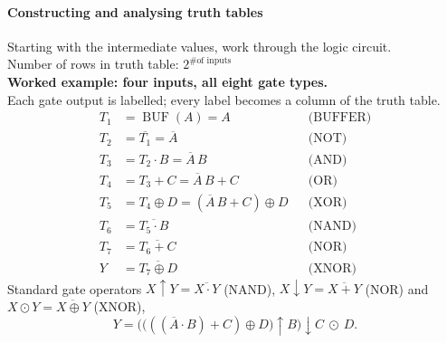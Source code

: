 \paragraph{Constructing and analysing truth tables}
Starting with the intermediate values, work through the logic circuit. \\
Number of rows in truth table: $2^\text{\# of inputs}$\\
\textbf{Worked example: four inputs, all eight gate types.}\\
Each gate output is labelled; every label becomes a column of the truth table.
\[
\begin{aligned}
T_1 &= \operatorname{BUF}(A) = A &&\text{(BUFFER)}\\
T_2 &= \overline{T_1} = \overline{A} &&\text{(NOT)}\\
T_3 &= T_2 \cdot B = \overline{A}\,B &&\text{(AND)}\\
T_4 &= T_3 + C = \overline{A}\,B + C &&\text{(OR)}\\
T_5 &= T_4 \oplus D = (\overline{A}\,B + C)\oplus D &&\text{(XOR)}\\
T_6 &= \overline{T_5 \cdot B} &&\text{(NAND)}\\
T_7 &= \overline{T_6 + C} &&\text{(NOR)}\\
Y   &= \overline{T_7 \oplus D} &&\text{(XNOR)}
\end{aligned}
\]
Standard gate operators
$X\uparrow Y=\overline{X\cdot Y}$ (NAND), $X\downarrow Y=\overline{X+Y}$ (NOR)
and $X\odot Y=\overline{X\oplus Y}$ (XNOR),
\[
Y=\Big(\big(((\overline{A}\cdot B)+C)\oplus D\big)\uparrow B\Big)\downarrow C\ \odot\ D .
\]
